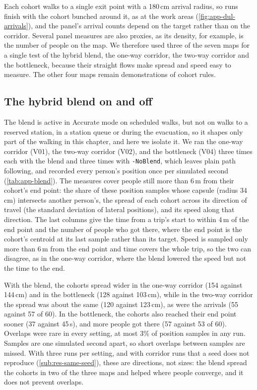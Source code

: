 Each cohort walks to a single exit point with a 180\,cm arrival radius, so runs finish with the cohort bunched around it, as at the work areas (\cref{fig:app-dul-arrivals}), and the panel's arrival counts depend on the target rather than on the corridor. Several panel measures are also proxies, as its density, for example, is the number of people on the map. We therefore used three of the seven maps for a single test of the hybrid blend, the one-way corridor, the two-way corridor and the bottleneck, because their straight flows make spread and speed easy to measure. The other four maps remain demonstrations of cohort rules.

\subsection{The hybrid blend on and off}
\label{sub:app-blend}

The blend is active in Accurate mode on scheduled walks, but not on walks to a reserved station, in a station queue or during the evacuation, so it shapes only part of the walking in this chapter, and here we isolate it. We ran the one-way corridor (V01), the two-way corridor (V02), and the bottleneck (V04) three times each with the blend and three times with \texttt{-NoBlend}, which leaves plain path following, and recorded every person's position once per simulated second (\cref{tab:app-blend}). The measures cover people still more than 6\,m from their cohort's end point: the share of these position samples whose capsule (radius 34\,cm) intersects another person's, the spread of each cohort across its direction of travel (the standard deviation of lateral positions), and its speed along that direction. The last columns give the time from a trip's start to within 4\,m of the end point and the number of people who got there, where the end point is the cohort's centroid at its last sample rather than its target. Speed is sampled only more than 6\,m from the end point and time covers the whole trip, so the two can disagree, as in the one-way corridor, where the blend lowered the speed but not the time to the end.

With the blend, the cohorts spread wider in the one-way corridor (154 against 144\,cm) and in the bottleneck (128 against 103\,cm), while in the two-way corridor the spread was about the same (120 against 123\,cm), as were the arrivals (55 against 57 of 60). In the bottleneck, the cohorts also reached their end point sooner (37 against 45\,s), and more people got there (57 against 53 of 60). Overlaps were rare in every setting, at most 3\% of position samples in any run. Samples are one simulated second apart, so short overlaps between samples are missed. With three runs per setting, and with corridor runs that a seed does not reproduce (\cref{sub:res-same-seed}), these are directions, not sizes: the blend spread the cohorts in two of the three maps and helped where people converge, and it does not prevent overlaps.

